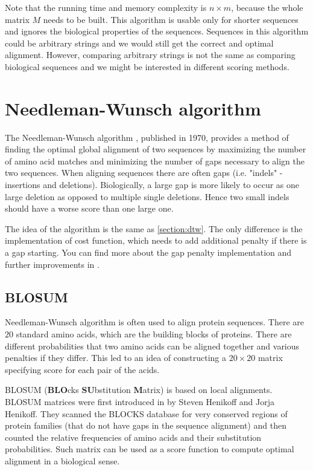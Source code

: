 Note that the running time and memory complexity is $n \times m$, because the whole matrix $M$ needs
to be built. This algorithm is usable only for shorter sequences and ignores the biological
properties of the sequences. Sequences in this algorithm could be arbitrary strings and we would
still get the correct and optimal alignment. However, comparing arbitrary strings is not the same as
comparing biological sequences and we might be interested in different scoring methods.

\section{Needleman-Wunsch algorithm}

The Needleman-Wunsch algorithm \cite{NEEDLEMAN1970443}, published in 1970, provides a method of
finding the optimal global alignment of two sequences by maximizing the number of amino acid matches
and minimizing the number of gaps necessary to align the two sequences. When aligning sequences
there are often gaps (i.e. "indels" - insertions and deletions). Biologically, a large gap is more
likely to occur as one large deletion as opposed to multiple single deletions. Hence two small
indels should have a worse score than one large one.

The idea of the algorithm is the same as \ref{section:dtw}. The only difference is the
implementation of cost function, which needs to add additional penalty if there is a gap starting.
You can find more about the gap penalty implementation and further improvements in
\cite{Boes2014ImprovingTN}.

\subsection{BLOSUM}

Needleman-Wunsch algorithm is often used to align protein sequences. There are $20$ standard amino
acids, which are the building blocks of proteins. There are different probabilities that two amino
acids can be aligned together and various penalties if they differ. This led to an idea of
constructing a $20 \times 20$ matrix specifying score for each pair of the acids. 

BLOSUM (\textbf{BLO}cks \textbf{SU}bstitution \textbf{M}atrix) is based on local alignments. BLOSUM
matrices were first introduced in by Steven Henikoff and Jorja Henikoff. They scanned the BLOCKS
database for very conserved regions of protein families (that do not have gaps in the sequence
alignment) and then counted the relative frequencies of amino acids and their substitution
probabilities. Such matrix can be used as a score function to compute optimal alignment in a
biological sense.

